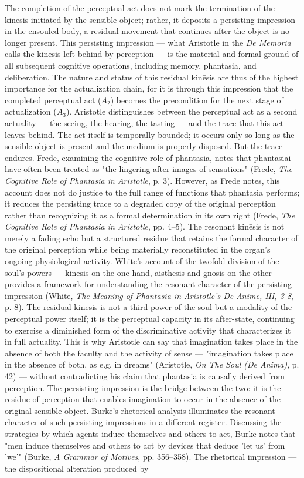 The completion of the perceptual act does not mark the termination of the kinēsis initiated by the sensible object; rather, it deposits a persisting impression in the ensouled body, a residual movement that continues after the object is no longer present. This persisting impression --- what Aristotle in the \textit{De Memoria} calls the kinēsis left behind by perception --- is the material and formal ground of all subsequent cognitive operations, including memory, phantasia, and deliberation. The nature and status of this residual kinēsis are thus of the highest importance for the actualization chain, for it is through this impression that the completed perceptual act ($A_2$) becomes the precondition for the next stage of actualization ($A_3$). Aristotle distinguishes between the perceptual act as a second actuality --- the seeing, the hearing, the tasting --- and the trace that this act leaves behind. The act itself is temporally bounded; it occurs only so long as the sensible object is present and the medium is properly disposed. But the trace endures. Frede, examining the cognitive role of phantasia, notes that phantasiai have often been treated as "the lingering after-images of sensations" (Frede, \textit{The Cognitive Role of Phantasia in Aristotle}, p. 3). However, as Frede notes, this account does not do justice to the full range of functions that phantasia performs; it reduces the persisting trace to a degraded copy of the original perception rather than recognizing it as a formal determination in its own right (Frede, \textit{The Cognitive Role of Phantasia in Aristotle}, pp. 4--5). The resonant kinēsis is not merely a fading echo but a structured residue that retains the formal character of the original perception while being materially reconstituted in the organ's ongoing physiological activity. White's account of the twofold division of the soul's powers --- kinēsis on the one hand, aisthēsis and gnōsis on the other --- provides a framework for understanding the resonant character of the persisting impression (White, \textit{The Meaning of Phantasia in Aristotle's De Anime, III, 3-8}, p. 8). The residual kinēsis is not a third power of the soul but a modality of the perceptual power itself; it is the perceptual capacity in its after-state, continuing to exercise a diminished form of the discriminative activity that characterizes it in full actuality. This is why Aristotle can say that imagination takes place in the absence of both the faculty and the activity of sense --- "imagination takes place in the absence of both, as e.g. in dreams" (Aristotle, \textit{On The Soul (De Anima)}, p. 42) --- without contradicting his claim that phantasia is causally derived from perception. The persisting impression is the bridge between the two: it is the residue of perception that enables imagination to occur in the absence of the original sensible object. Burke's rhetorical analysis illuminates the resonant character of such persisting impressions in a different register. Discussing the strategies by which agents induce themselves and others to act, Burke notes that "men induce themselves and others to act by devices that deduce 'let us' from 'we'" (Burke, \textit{A Grammar of Motives}, pp. 356--358). The rhetorical impression --- the dispositional alteration produced by 